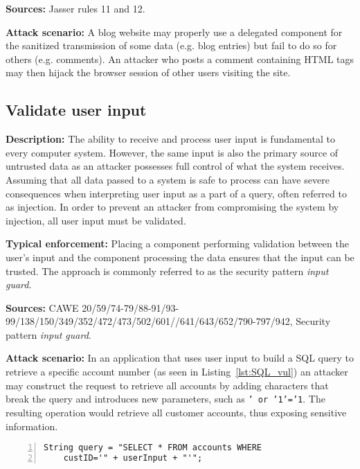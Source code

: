  \textbf{Sources:} Jasser rules 11 and 12.
 
 \textbf{Attack scenario:}
 A blog website may properly use a delegated component for the sanitized transmission of some data (e.g. blog entries) but fail to do so for others (e.g. comments). An attacker who posts a comment containing HTML tags may then hijack the browser session of other users visiting the site.

\subsection{Validate user input} 

\textbf{Description:} 
The ability to receive and process user input is fundamental to every computer system. However, the same input is also the primary source of untrusted data as an attacker possesses full control of what the system receives. Assuming that all data passed to a system is safe to process can have severe consequences when interpreting user input as a part of a query, often referred to as injection. In order to prevent an attacker from compromising the system by injection, all user input must be validated.
 
 \textbf{Typical enforcement:} 
 Placing a component performing validation between the user's input and the component processing the data ensures that the input can be trusted. The approach is commonly referred to as the security pattern \textit{input guard}.
 
 \textbf{Sources:} CAWE 20/59/74-79/88-91/93-99/138/150/349/352/472/473/502/601/\newline/641/643/652/790-797/942, Security pattern \textit{input guard}.
 
 \textbf{Attack scenario:}
 In an application that uses user input to build a SQL query to retrieve a specific account number (as seen in Listing~\ref{lst:SQL_vul}) an attacker may construct the request to retrieve all accounts by adding characters that break the query and introduces new parameters, such as \texttt{' or '1'='1}. The resulting operation would retrieve all customer accounts, thus exposing sensitive information.
 
 \begin{center}
\begin{minipage}{0.65\textwidth}
\begin{lstlisting}[caption={Example of a vulnerable SQL query}, captionpos=b, label=lst:SQL_vul, numbers=left, showstringspaces=false]
String query = "SELECT * FROM accounts WHERE 
    custID='" + userInput + "'";
\end{lstlisting}
\end{minipage}
\end{center}

